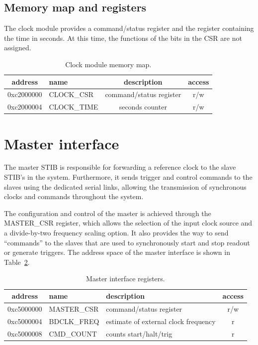 \documentclass[11pt]{article}
\begin{document}
\subsection{Memory map and registers}

The clock module provides a command/status register and the register
containing the time in seconds.  At this time, the functions of the bits
in the CSR are not assigned.

\begin{table}
\begin{center}
\small
\begin{tabular}{|c|l|c|c|} \hline
address & name & description & access \\ \hline \hline
0xc2000000 & CLOCK\_CSR & command/status register & r/w \\ \hline
0xc2000004 & CLOCK\_TIME & seconds counter & r/w \\ \hline
\end{tabular}
\end{center}
\caption{\label{tab-clock}Clock module memory map.}
\end{table}

\section{Master interface}

The master STIB is responsible for forwarding a reference clock
to the slave STIB's in the system.  Furthermore, it sends trigger
and control commands to the slaves using the dedicated serial links,
allowing the transmission of synchronous clocks and commands throughout
the system.

The configuration and control of the master is achieved through the
MASTER\_CSR register, which allows the selection of the input clock source
and a divide-by-two frequency scaling option.  It also provides the way
to send ``commands'' to the slaves that are used to synchronously start
and stop readout or generate triggers.  The address space of the master
interface is shown in Table~\ref{tab-master}.
\begin{table}[h]
\begin{center}
\small
\begin{tabular}{|c|l|l|c|} \hline
address & name & description & access \\ \hline \hline
0xc5000000 & MASTER\_CSR & command/status register & r/w \\ \hline
0xc5000004 & BDCLK\_FREQ & estimate of external clock frequency & r \\ \hline
0xc5000008 & CMD\_COUNT & counts start/halt/trig & r \\ \hline
\end{tabular}
\end{center}
\caption{\label{tab-master}Master interface registers.}
\end{table}
\end{document}
